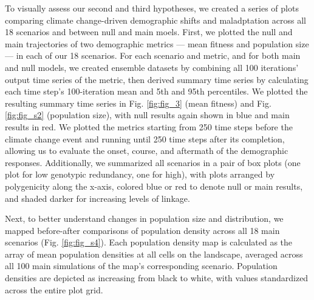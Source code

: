 \documentclass[9pt,twocolumn,twoside,lineno]{pnas-new}
\begin{document}
{To visually assess our second and third hypotheses, we created a series of
plots comparing climate change-driven demographic shifts
and maladptation across all 18 scenarios and between null and main moels.
First, we plotted the 
null and main trajectories of two demographic
metrics --- mean fitness and population size --- in 
each of our 18 scenarios. For each scenario and metric, and 
for both main and null models, we created ensemble datasets by combining all 100 
iterations’ output time series of the metric,
then derived summary time series by calculating each time step's
100-iteration mean and 5th and 95th percentiles.
We plotted the resulting summary time series in Fig. \ref{fig:fig_3} (mean fitness)
and Fig. \ref{fig:fig_s2} (population size), with null results again shown in blue
and main results in red.
We plotted the metrics starting from 250 time steps before the climate change event
and running until 250 time steps after its completion, allowing us
to evaluate the onset, course, and aftermath of the demographic responses.
Additionally, we summarized all scenarios in a pair of box plots
(one plot for low genotypic redundancy, one for high),
with plots arranged by polygenicity along the x-axis,
colored blue or red to denote null or main results,
and shaded darker for increasing levels of linkage.

Next, to better understand changes in population size and distribution,
we mapped before-after comparisons of population density across all 18
main scenarios (Fig. \ref{fig:fig_s4}).
Each population density map is calculated as
the array of mean population densities at all cells on the landscape,
averaged across all 100 main simulations of the map's corresponding scenario.
Population densities are depicted as increasing from black to white, with
values standardized across the entire plot grid.

}
\end{document}
